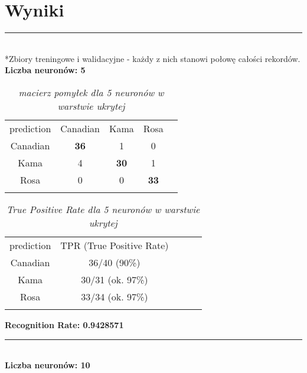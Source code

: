 \documentclass[a4paper,12pt]{article}
\newcommand{\linia}{\rule{\linewidth}{0.5pt}}
\theoremstyle{mytheor}
\begin{document}
\section*{Wyniki}
\linia\\
*Zbiory treningowe i walidacyjne - każdy z nich stanowi połowę całości rekordów.\\

\textbf{Liczba neuronów: 5}\\

\begin{table}[H]
\begin{tabular}{ccccc}
prediction & Canadian & Kama & Rosa  &  \\
Canadian & \textbf{36} & 1 & 0 &  \\
Kama & 4 & \textbf{30} & 1 &  \\
Rosa & 0 & 0 & \textbf{33} &  \\
&&&& 
\end{tabular}
\caption{\textit{macierz pomyłek dla 5 neuronów w warstwie ukrytej}}
\label{tab:1}
\end{table}
\begin{table}[H]
\begin{tabular}{ccccc}
prediction & TPR (True Positive Rate) &  \\
Canadian & 36/40 (90\%) & \\
Kama & 30/31 (ok. 97\%) & \\
Rosa & 33/34 (ok. 97\%) & \\
&&
\end{tabular}
\caption{\textit{True Positive Rate dla 5 neuronów w warstwie ukrytej}}
\label{tab:2}
\end{table}
\textbf{Recognition Rate: 0.9428571}\\
\linia\\

\textbf{Liczba neuronów: 10}\\
\end{document}
